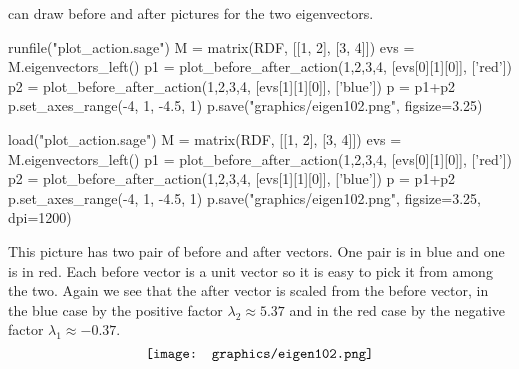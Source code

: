 \Sage{} can draw before and after pictures for the two eigenvectors.
\begin{sageoutput}[d,0,3]
runfile("plot_action.sage")  
M = matrix(RDF, [[1, 2], [3, 4]])
evs = M.eigenvectors_left()  
p1 = plot_before_after_action(1,2,3,4, [evs[0][1][0]], ['red']) 
p2 = plot_before_after_action(1,2,3,4, [evs[1][1][0]], ['blue']) 
p = p1+p2
p.set_axes_range(-4, 1, -4.5, 1) 
p.save("graphics/eigen102.png", figsize=3.25)
\end{sageoutput}
\begin{sagesilent}
load("plot_action.sage")  
M = matrix(RDF, [[1, 2], [3, 4]])
evs = M.eigenvectors_left()  
p1 = plot_before_after_action(1,2,3,4, [evs[0][1][0]], ['red']) 
p2 = plot_before_after_action(1,2,3,4, [evs[1][1][0]], ['blue']) 
p = p1+p2
p.set_axes_range(-4, 1, -4.5, 1) 
p.save("graphics/eigen102.png", figsize=3.25, dpi=1200)
\end{sagesilent}
\noindent
This picture has two pair of before and after vectors.
One pair is in blue and one is in red.
Each before vector is a unit vector so it is easy to pick it from among the
two.
Again we see that 
the after vector is scaled from the before vector, 
in the blue case by the positive factor $\lambda_2\approx 5.37$ and
in the red case by the negative factor $\lambda_1\approx -0.37$.
\begin{equation*}
  \vcenteredhbox{\texttt{[image: graphics/eigen102.png]}}
\end{equation*}





